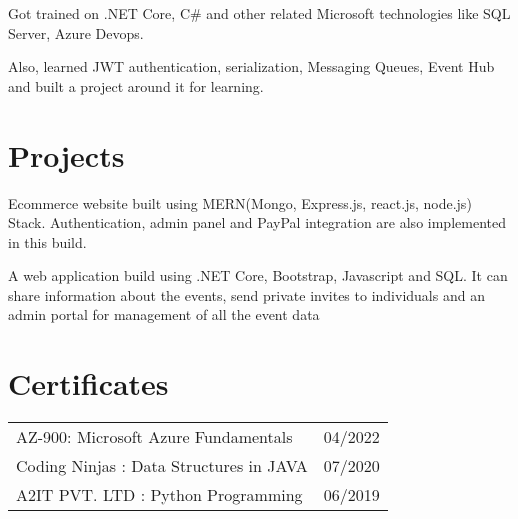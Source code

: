 \documentclass[]{deedy-resume-openfont}
\begin{document}
\begin{minipage}[t]{0.66\textwidth}
\begin{tightemize}
\item Got trained on .NET Core, C\# and other related Microsoft technologies like SQL Server, Azure Devops.
\item Also, learned JWT authentication, serialization, Messaging Queues, Event Hub and built a project around it for learning.
\end{tightemize}
\sectionsep


\section{Projects}
Ecommerce website built using MERN(Mongo, Express.js, react.js, node.js) Stack. Authentication, admin panel and
PayPal integration are also implemented in this build.  
\sectionsep

A web application build using .NET Core, Bootstrap, Javascript and SQL. It can share information about the events, send
private invites to individuals and an admin portal for management of all the event data
\sectionsep


\section{Certificates} 
\begin{tabular}{ll}
AZ-900: Microsoft Azure Fundamentals	     & 04/2022\\
Coding Ninjas : Data Structures in JAVA	     & 07/2020\\
A2IT PVT. LTD : Python Programming                        & 06/2019\\
\end{tabular}
\sectionsep


\end{minipage} 
\end{document}
